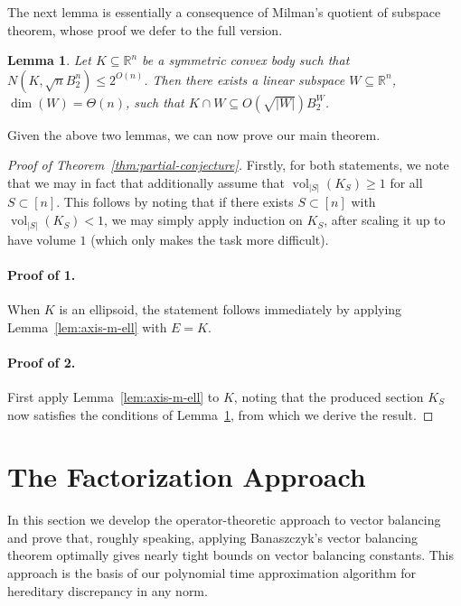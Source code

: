 \documentclass[11pt]{article}
\newtheorem{lemma}[theorem]{Lemma}
\newcommand{\R}{{\mathbb{R}}}
\DeclareMathOperator{\vol}{vol}
\begin{document}
The next lemma is essentially a consequence of Milman's quotient of subspace
theorem, whose proof we defer to the full version.

\begin{lemma}
\label{lem:cover-to-section}
Let $K \subseteq \R^n$ be a symmetric convex body such that $N(K,\sqrt{n}B_2^n)
\leq 2^{O(n)}$. Then there exists a linear subspace $W \subseteq \R^n$, $\dim(W) =
\Theta(n)$, such that $K \cap W \subseteq O(\sqrt{|W|}) B_2^W$.  
\end{lemma}

Given the above two lemmas, we can now prove our main theorem.

\begin{proof}[Proof of Theorem~\ref{thm:partial-conjecture}]
Firstly, for both statements, we note that we may in fact that additionally
assume that $\vol_{|S|}(K_S) \geq 1$ for all $S \subset [n]$. This follows by
noting that if there exists $S \subset [n]$ with $\vol_{|S|}(K_S) < 1$, we may
simply apply induction on $K_S$, after scaling it up to have volume $1$ (which
only makes the task more difficult). 

\paragraph{\bf Proof of 1.} When $K$ is an ellipsoid, the statement follows
immediately by applying Lemma~\ref{lem:axis-m-ell} with $E=K$. 

\paragraph{\bf Proof of 2.} First apply Lemma~\ref{lem:axis-m-ell} to $K$,
noting that the produced section $K_S$ now satisfies the conditions of
Lemma~\ref{lem:cover-to-section}, from which we derive the result.  
\end{proof}

\section{The Factorization Approach}
\label{sec:factorization}

In this section we develop the operator-theoretic approach to vector
balancing and prove that, roughly speaking, applying Banaszczyk's vector
balancing theorem optimally gives nearly tight bounds on vector
balancing constants. This approach is the basis of our polynomial time
approximation algorithm for hereditary discrepancy in any norm. 
\end{document}
